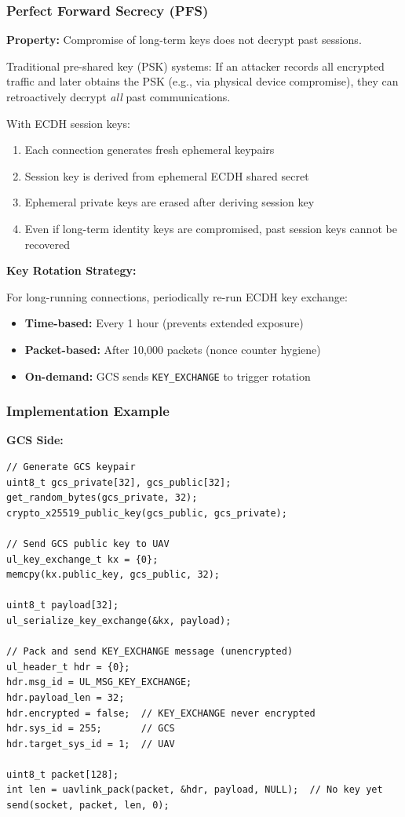 \documentclass[11pt,a4paper]{article}
\begin{document}
\subsubsection{Perfect Forward Secrecy (PFS)}

\textbf{Property:} Compromise of long-term keys does not decrypt past sessions.

Traditional pre-shared key (PSK) systems: If an attacker records all encrypted traffic and later obtains the PSK (e.g., via physical device compromise), they can retroactively decrypt \emph{all} past communications.

With ECDH session keys:
\begin{enumerate}[noitemsep]
    \item Each connection generates fresh ephemeral keypairs
    \item Session key is derived from ephemeral ECDH shared secret
    \item Ephemeral private keys are erased after deriving session key
    \item Even if long-term identity keys are compromised, past session keys cannot be recovered
\end{enumerate}

\textbf{Key Rotation Strategy:}

For long-running connections, periodically re-run ECDH key exchange:
\begin{itemize}[noitemsep]
    \item \textbf{Time-based:} Every 1 hour (prevents extended exposure)
    \item \textbf{Packet-based:} After 10,000 packets (nonce counter hygiene)
    \item \textbf{On-demand:} GCS sends \texttt{KEY\_EXCHANGE} to trigger rotation
\end{itemize}

\subsubsection{Implementation Example}

\textbf{GCS Side:}
\begin{lstlisting}[caption={GCS ECDH Key Exchange Initialization}]
// Generate GCS keypair
uint8_t gcs_private[32], gcs_public[32];
get_random_bytes(gcs_private, 32);
crypto_x25519_public_key(gcs_public, gcs_private);

// Send GCS public key to UAV
ul_key_exchange_t kx = {0};
memcpy(kx.public_key, gcs_public, 32);

uint8_t payload[32];
ul_serialize_key_exchange(&kx, payload);

// Pack and send KEY_EXCHANGE message (unencrypted)
ul_header_t hdr = {0};
hdr.msg_id = UL_MSG_KEY_EXCHANGE;
hdr.payload_len = 32;
hdr.encrypted = false;  // KEY_EXCHANGE never encrypted
hdr.sys_id = 255;       // GCS
hdr.target_sys_id = 1;  // UAV

uint8_t packet[128];
int len = uavlink_pack(packet, &hdr, payload, NULL);  // No key yet
send(socket, packet, len, 0);
\end{lstlisting}
\end{document}
